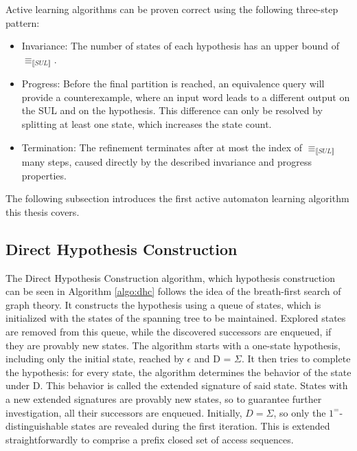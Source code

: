 Active learning algorithms can be proven correct using the following three-step pattern:
\begin{itemize}
	\item Invariance: The number of states of each hypothesis has an upper bound of $\equiv_{\llbracket SUL\rrbracket}$.
	\item Progress: Before the final partition is reached, an equivalence query will provide a counterexample, where an input word leads to a different output on the SUL and on the hypothesis. This difference can only be resolved by splitting at least one state, which increases the state count.
	\item Termination: The refinement terminates after at most the index of $\equiv_{\llbracket SUL\rrbracket}$ many steps, caused directly by the described invariance and progress properties.
\end{itemize}

The following subsection introduces the first active automaton learning algorithm this thesis covers.

\subsection{Direct Hypothesis Construction\cite{10.1007/978-3-642-34781-8_19}}
The Direct Hypothesis Construction algorithm, which hypothesis construction can be seen in Algorithm \ref{algo:dhc}  follows the idea of the breath-first search of graph theory. It constructs the hypothesis using a queue of states, which is initialized with the states of the spanning tree to be maintained. Explored states are removed from this queue, while the discovered successors are enqueued, if they are provably new states. The algorithm starts with a one-state hypothesis, including only the initial state, reached by $\epsilon$ and D = $\Sigma$. It then tries to complete the hypothesis: for every state, the algorithm determines the behavior of the state under D. This behavior is called the extended signature of said state. States with a new extended signatures are provably new states, so to guarantee further investigation, all their successors are enqueued. Initially, $D=\Sigma$, so only the $1^=$-distinguishable states are revealed during the first iteration. This is extended straightforwardly to comprise a prefix closed set of access sequences. \cite{Steffen2011}\cite{10.1007/978-3-642-34781-8_19}

